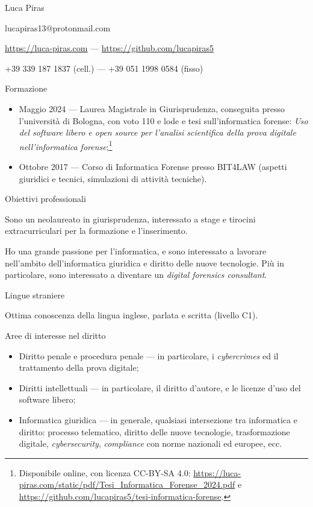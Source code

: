 \documentclass[12pt]{article}
\begin{document}
\pagestyle{empty}

\begin{center}

  {\Huge Luca Piras}

  \vspace{0.616cm}

  lucapiras13@protonmail.com

  \url{https://luca-piras.com} --- \url{https://github.com/lucapiras5}

  +39 339 187 1837 (cell.) --- +39 051 1998 0584 (fisso)

  \vspace{0.616cm}

\end{center}

{\Large Formazione}

\begin{itemize}
\item Maggio 2024 --- Laurea Magistrale in Giurisprudenza, conseguita presso l'università di Bologna, con voto 110 e lode e tesi sull'informatica forense: \textit{Uso del software libero e open source per l'analisi scientifica della prova digitale nell'informatica forense};\footnote{Disponibile online, con licenza CC-BY-SA 4.0: \url{https://luca-piras.com/static/pdf/Tesi_Informatica_Forense_2024.pdf} e \url{https://github.com/lucapiras5/tesi-informatica-forense}.}
\item Ottobre 2017 --- Corso di Informatica Forense presso BIT4LAW (aspetti giuridici e tecnici, simulazioni di attività tecniche).
\end{itemize}

{\Large Obiettivi professionali}

Sono un neolaureato in giurisprudenza, interessato a stage e tirocini extracurriculari per la formazione e l'inserimento.

Ho una grande passione per l'informatica, e sono interessato a lavorare nell'ambito dell'informatica giuridica e diritto delle nuove tecnologie. Più in particolare, sono interessato a diventare un \textit{digital forensics consultant}.

{\Large Lingue straniere}

Ottima conoscenza della lingua inglese, parlata e scritta (livello C1).

{\Large Aree di interesse nel diritto}

\begin{itemize}
\item Diritto penale e procedura penale --- in particolare, i \textit{cybercrimes} ed il trattamento della prova digitale;
\item Diritti intellettuali --- in particolare, il diritto d'autore, e le licenze d'uso del software libero;
\item Informatica giuridica --- in generale, qualsiasi intersezione tra informatica e diritto: processo telematico, diritto delle nuove tecnologie, trasformazione digitale, \textit{cybersecurity}, \textit{compliance} con norme nazionali ed europee, ecc.
\end{itemize}
\end{document}
